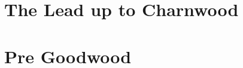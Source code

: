 \documentclass[noraggedright]{turabian-researchpaper}
\begin{document}
\section{} %


\section{The Lead up to Charnwood}












\section{Pre Goodwood}



\end{document}
